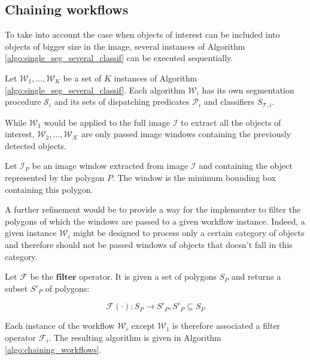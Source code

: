 \subsection{Chaining workflows}

To take into account the case when objects of interest can be included into objects of bigger size in the image, several instances of Algorithm \ref{algo:single_seg_several_classif} can be executed sequentially. 

\begin{definition}\label{def:several_w_op}
	Let $\mathcal{W}_1, ..., \mathcal{W}_K$ be a set of $K$ instances of Algorithm \ref{algo:single_seg_several_classif}. Each algorithm $\mathcal{W}_i$ has its own segmentation procedure $\mathcal{S}_i$ and its sets of dispatching predicates $\mathcal{P}_i$ and classifiers $S_{\mathcal{T},i}$.
\end{definition}

While $\mathcal{W}_1$ would be applied to the full image $\mathcal{I}$ to extract all the objects of interest, $\mathcal{W_2}, ..., \mathcal{W_K}$ are only passed image windows containing the previously detected objects.

\begin{definition}\label{def:image_window}
	Let $\mathcal{I}_P$ be an image window extracted from image $\mathcal{I}$ and containing the object represented by the polygon $P$. The window is the minimum bounding box containing this polygon.
\end{definition}

A further refinement would be to provide a way for the implementer to filter the polygons of which the windows are passed to a given workflow instance. Indeed, a given instance $\mathcal{W}_i$ might be designed to process only a certain category of objects and therefore should not be passed windows of objects that doesn't fall in this category. 

\begin{definition}\label{def:filter_op}
	Let $\mathcal{F}$ be the $\textbf{filter}$ operator. It is given a set of polygons $S_P$ and returns a subset $S'_P$ of polygons:
	
	\begin{equation}
		\mathcal{F}(\cdot): S_P \rightarrow S'_P, S'_P \subseteq S_P
	\end{equation}
\end{definition}

Each instance of the workflow $\mathcal{W}_i$ except $\mathcal{W}_1$ is therefore associated a filter operator $\mathcal{F}_i$. The resulting algorithm is given in Algorithm \ref{algo:chaining_workflows}.

